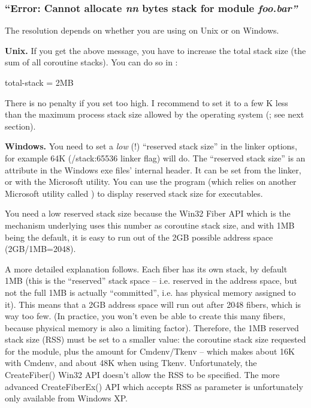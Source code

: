 \subsubsection{``Error: Cannot allocate \textit{nn} bytes stack for module \textit{foo.bar''}}

The resolution depends on whether you are using {\opp} on Unix or on Windows.

\textbf{Unix.}
If you get the above message, you have to increase the total stack
size (the sum of all coroutine stacks). You can do
so in :

\begin{inifile}
[General]
total-stack = 2MB
\end{inifile}

There is no penalty if you set  too high. I
recommend to set it to a few K less than the maximum process stack
size allowed by the operating system (; see
next section).


\textbf{Windows.}
You need to set a \textit{low} (!) ``reserved stack size''
in the linker options, for example 64K (/stack:65536 linker flag) will do.
The ``reserved stack size'' is an attribute in the Windows exe
files' internal header. It can be set from the linker, or with
the  Microsoft utility. You can use the 
program (which relies on another Microsoft utility called )
to display reserved stack size for executables.

You need a low reserved stack size because the Win32 Fiber API
which is the mechanism underlying  uses
this number as coroutine stack size, and with 1MB being the default,
it is easy to run out of the 2GB possible address space (2GB/1MB=2048).

A more detailed explanation follows.
Each fiber has its own stack, by default 1MB (this is the ``reserved''
stack space -- i.e. reserved in the address space, but not the full
1MB is actually ``committed'', i.e. has physical memory assigned to it).
This means that a 2GB address space will run out after 2048 fibers,
which is way too few. (In practice, you won't even be able to create
this many fibers, because physical memory is also a limiting factor).
Therefore, the 1MB reserved stack size (RSS) must be set to a smaller
value: the coroutine stack size requested for the module, plus
the  amount for Cmdenv/Tkenv -- which makes
about 16K with Cmdenv, and about 48K when using Tkenv.
Unfortunately, the CreateFiber() Win32 API doesn't allow the RSS to be
specified. The more advanced CreateFiberEx() API which accepts RSS as
parameter is unfortunately only available from Windows XP.

